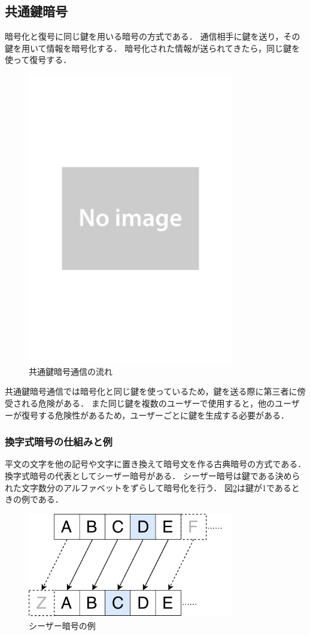 \documentclass[a4j,12pt]{jsarticle}
\begin{document}
\subsection{共通鍵暗号}
暗号化と復号に同じ鍵を用いる暗号の方式である．
通信相手に鍵を送り，その鍵を用いて情報を暗号化する．
暗号化された情報が送られてきたら，同じ鍵を使って復号する．


\begin{figure}[H]
\centering
\includegraphics[width=9cm]{noimage.pdf}
\caption{共通鍵暗号通信の流れ}
\label{fig:no}
\end{figure} 

共通鍵暗号通信では暗号化と同じ鍵を使っているため，鍵を送る際に第三者に傍受される危険がある．
また同じ鍵を複数のユーザーで使用すると，他のユーザーが復号する危険性があるため，ユーザーごとに鍵を生成する必要がある．



\subsubsection{換字式暗号の仕組みと例}
平文の文字を他の記号や文字に置き換えて暗号文を作る古典暗号の方式である．
換字式暗号の代表としてシーザー暗号がある．
シーザー暗号は鍵である決められた文字数分のアルファベットをずらして暗号化を行う．
図\ref{fig:05}は鍵が1であるときの例である．

\begin{figure}[H]
\centering
\includegraphics[width=9cm]{05.pdf}
\caption{シーザー暗号の例}
\label{fig:05}
\end{figure} 
\end{document}
